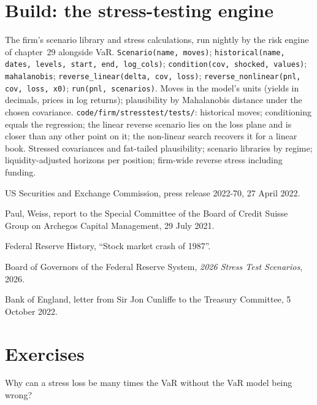 \section{Build: the stress-testing engine}\label{bld:rc:stress-testing-and-scenarios:stresstest}

\begin{build}
 The firm's scenario library and stress calculations, run nightly by the risk
engine of chapter~29 alongside VaR.
 \texttt{Scenario(name, moves)}; \texttt{historical(name, dates, levels,
start, end, log\_cols)}; \texttt{condition(cov, shocked, values)}; \texttt{mahalanobis};
\texttt{reverse\_linear(delta, cov, loss)}; \texttt{reverse\_nonlinear(pnl, cov, loss, x0)};
\texttt{run(pnl, scenarios)}.
 Moves in the model's units (yields in decimals, prices in log returns);
plausibility by Mahalanobis distance under the chosen covariance.
 \texttt{code/firm/stresstest/tests/}: historical moves; conditioning
equals the regression; the linear reverse scenario lies on the loss plane and is closer than any
other point on it; the non-linear search recovers it for a linear book.
 Stressed covariances and fat-tailed plausibility; scenario libraries by
regime; liquidity-adjusted horizons per position; firm-wide reverse stress including funding.
\end{build}

\begin{omsources}
\item US Securities and Exchange Commission, press release 2022-70, 27 April 2022.
\item Paul, Weiss, report to the Special Committee of the Board of Credit Suisse Group on
Archegos Capital Management, 29 July 2021.
\item Federal Reserve History, ``Stock market crash of 1987''.
\item Board of Governors of the Federal Reserve System, \emph{2026 Stress Test Scenarios}, 2026.
\item Bank of England, letter from Sir Jon Cunliffe to the Treasury Committee, 5 October 2022.
\end{omsources}

\section{Exercises}

\begin{exercise}[$\star$]\label{exo:rc:stress-testing-and-scenarios:1}
Why can a stress loss be many times the VaR without the VaR model being wrong?
\end{exercise}


